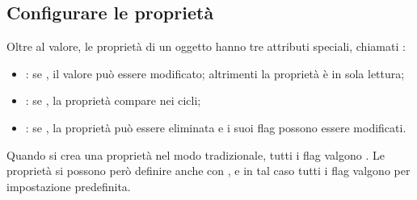 \subsection{Configurare le proprietà}

Oltre al valore, le proprietà di un oggetto hanno tre attributi speciali,
chiamati :

\begin{itemize}
  \item {}: se , il valore può essere modificato;
        altrimenti la proprietà è in sola lettura;
  \item {}: se , la proprietà compare nei cicli;
  \item {}: se , la proprietà può essere eliminata e
        i suoi flag possono essere modificati.
\end{itemize}

Quando si crea una proprietà nel modo \guillemotleft tradizionale\guillemotright, tutti i flag valgono
. Le proprietà si possono però definire anche con
, e in tal caso tutti i flag valgono
 per impostazione predefinita.

